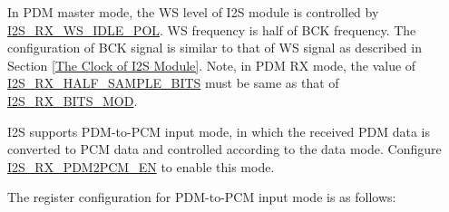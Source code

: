 \documentclass[main\_\_CN.tex]{subfiles}
\begin{document}
In PDM master mode, the WS level of I2S module is controlled by  \hyperref[fielddesc:I2SRXWSIDLEPOL]{I2S\_RX\_WS\_IDLE\_POL}. WS frequency is half of BCK frequency. The configuration of BCK signal is similar to that of WS signal as described in Section  \ref{The Clock of I2S Module}. Note, in PDM RX mode, the value of  \hyperref[fielddesc:I2SRXHALFSAMPLEBITS]{I2S\_RX\_HALF\_SAMPLE\_BITS} must be same as that of  \hyperref[fielddesc:I2SRXBITSMOD]{I2S\_RX\_BITS\_MOD}.

I2S supports PDM-to-PCM input mode, in which the received PDM data is converted to PCM data and controlled according to the data mode. Configure  \hyperref[fielddesc:I2SRXPDM2PCMEN]{I2S\_RX\_PDM2PCM\_EN} to enable this mode.


The register configuration for PDM-to-PCM input mode is as follows:
\end{document}
